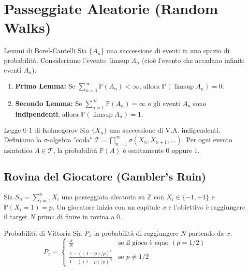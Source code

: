 \documentclass[11pt,a4paper]{article}
\begin{document}
\newpage
\section{Passeggiate Aleatorie (Random Walks)}

\begin{teorema}{Lemmi di Borel-Cantelli}{}
Sia $\{A_n\}$ una successione di eventi in uno spazio di probabilità. Consideriamo l'evento $\limsup A_n$ (cioè l'evento che accadano infiniti eventi $A_n$).
\begin{enumerate}
    \item \textbf{Primo Lemma:} Se $\sum_{n=1}^\infty \mathbb{P}(A_n) < \infty$, allora $\mathbb{P}(\limsup A_n) = 0$.
    \item \textbf{Secondo Lemma:} Se $\sum_{n=1}^\infty \mathbb{P}(A_n) = \infty$ e gli eventi $A_n$ sono \textbf{indipendenti}, allora $\mathbb{P}(\limsup A_n) = 1$.
\end{enumerate}
\end{teorema}

\begin{teorema}{Legge 0-1 di Kolmogorov}{}
Sia $\{X_n\}$ una successione di V.A. indipendenti. Definiamo la $\sigma$-algebra "coda" $\mathcal{T} = \bigcap_{n=1}^\infty \sigma(X_n, X_{n+1}, \dots)$. Per ogni evento asintotico $A \in \mathcal{T}$, la probabilità $\mathbb{P}(A)$ è esattamente $0$ oppure $1$.
\end{teorema}

\subsection{Rovina del Giocatore (Gambler's Ruin)}
Sia $S_n = \sum_{i=1}^n X_i$ una passeggiata aleatoria su $\mathbb{Z}$ con $X_i \in \{-1, +1\}$ e $\mathbb{P}(X_i = 1) = p$.
Un giocatore inizia con un capitale $x$ e l'obiettivo è raggiungere il target $N$ prima di finire in rovina a $0$.
\begin{teorema}{Probabilità di Vittoria}{}
Sia $P_x$ la probabilità di raggiungere $N$ partendo da $x$.
\[
P_x = 
\begin{cases}
\frac{x}{N} & \text{se il gioco è equo } (p = 1/2) \\
\frac{1 - ((1-p)/p)^x}{1 - ((1-p)/p)^N} & \text{se } p \neq 1/2
\end{cases}
\]
\end{teorema}
\end{document}
